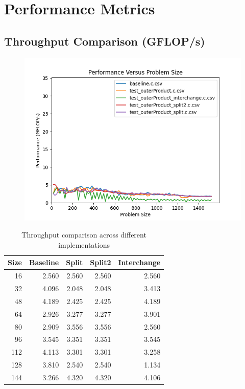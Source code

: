 \documentclass[11pt,a4paper]{article}
\begin{document}
\section{Performance Metrics}
\subsection{Throughput Comparison (GFLOP/s)}

\begin{figure}[H]
        \centering
        \includegraphics[width=1\linewidth]{combined.png}
\end{figure}

\begin{table}[H]
\centering
\begin{tabular}{@{}rrrrr@{}}
\toprule
Size & Baseline & Split & Split2 & Interchange \\
\midrule
16   & 2.560    & 2.560 & 2.560  & 2.560 \\
32   & 4.096    & 2.048 & 2.048  & 3.413 \\
48   & 4.189    & 2.425 & 2.425  & 4.189 \\
64   & 2.926    & 3.277 & 3.277  & 3.901 \\
80   & 2.909    & 3.556 & 3.556  & 2.560 \\
96   & 3.545    & 3.351 & 3.351  & 3.545 \\
112  & 4.113    & 3.301 & 3.301  & 3.258 \\
128  & 3.810    & 2.540 & 2.540  & 1.134 \\
144  & 3.266    & 4.320 & 4.320  & 4.106 \\
\bottomrule
\end{tabular}
\caption{Throughput comparison across different implementations}
\label{tab:throughput}
\end{table}
\end{document}
